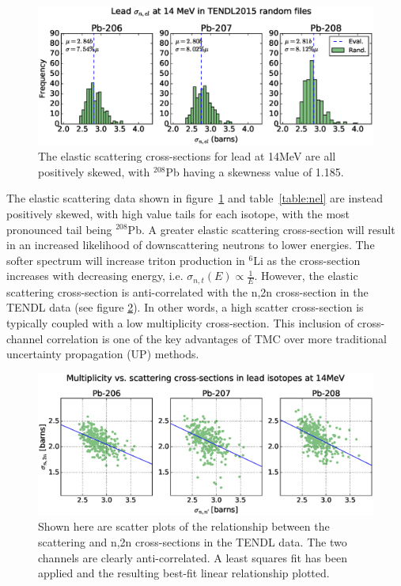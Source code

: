 \begin{figure}[H]
  \includegraphics[width=\textwidth]{pb_tendl_nel_hist}
  \caption{The elastic scattering cross-sections for lead at 14MeV are all positively skewed, with $^{208}$Pb having a skewness value of 1.185.}
  \label{fig:tendl_nel}
\end{figure}

The elastic scattering data shown in figure~\ref{fig:tendl_nel} and table~\ref{table:nel} are instead positively skewed, with high value tails for each isotope, with the most pronounced tail being $^{208}$Pb. A greater elastic scattering cross-section will result in an increased likelihood of downscattering neutrons to lower energies. The softer spectrum will increase triton production in $^{6}$Li as the cross-section increases with decreasing energy, i.e. $\sigma_{n,t}(E) \propto \frac{1}{E}$. However, the elastic scattering cross-section is anti-correlated with the n,2n cross-section in the TENDL data (see figure \ref{fig:pb_el_n2n_corr}). In other words, a high scatter cross-section is typically coupled with a low multiplicity cross-section. This inclusion of cross-channel correlation is one of the key advantages of TMC over more traditional uncertainty propagation (UP) methods. 


\begin{figure}[H]
	\includegraphics[width=\textwidth]{pb_el_n2n_corr}
  \caption{Shown here are scatter plots of the relationship between the scattering and n,2n cross-sections in the TENDL data. The two channels are clearly anti-correlated. A least squares fit has been applied and the resulting best-fit linear relationship plotted.}
	\label{fig:pb_el_n2n_corr}
\end{figure}

